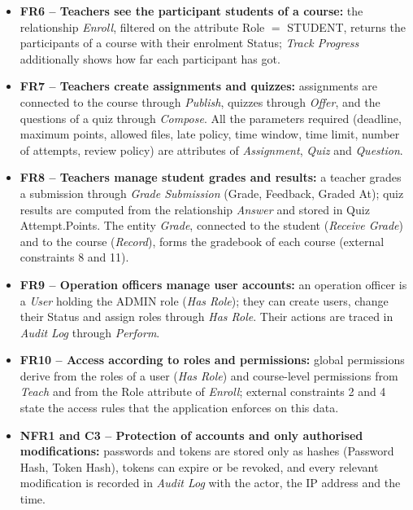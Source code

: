 \begin{itemize}
    \item \textbf{FR6 -- Teachers see the participant students of a course:} the relationship \textit{Enroll}, filtered on the attribute Role $=$ STUDENT, returns the participants of a course with their enrolment Status; \textit{Track Progress} additionally shows how far each participant has got.

    \item \textbf{FR7 -- Teachers create assignments and quizzes:} assignments are connected to the course through \textit{Publish}, quizzes through \textit{Offer}, and the questions of a quiz through \textit{Compose}. All the parameters required (deadline, maximum points, allowed files, late policy, time window, time limit, number of attempts, review policy) are attributes of \textit{Assignment}, \textit{Quiz} and \textit{Question}.

    \item \textbf{FR8 -- Teachers manage student grades and results:} a teacher grades a submission through \textit{Grade Submission} (Grade, Feedback, Graded At); quiz results are computed from the relationship \textit{Answer} and stored in Quiz Attempt.Points. The entity \textit{Grade}, connected to the student (\textit{Receive Grade}) and to the course (\textit{Record}), forms the gradebook of each course (external constraints 8 and 11).

    \item \textbf{FR9 -- Operation officers manage user accounts:} an operation officer is a \textit{User} holding the ADMIN role (\textit{Has Role}); they can create users, change their Status and assign roles through \textit{Has Role}. Their actions are traced in \textit{Audit Log} through \textit{Perform}.

    \item \textbf{FR10 -- Access according to roles and permissions:} global permissions derive from the roles of a user (\textit{Has Role}) and course-level permissions from \textit{Teach} and from the Role attribute of \textit{Enroll}; external constraints 2 and 4 state the access rules that the application enforces on this data.

    \item \textbf{NFR1 and C3 -- Protection of accounts and only authorised modifications:} passwords and tokens are stored only as hashes (Password Hash, Token Hash), tokens can expire or be revoked, and every relevant modification is recorded in \textit{Audit Log} with the actor, the IP address and the time.
\end{itemize}
